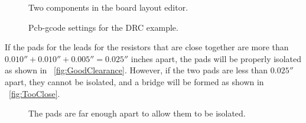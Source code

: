 \documentclass[11pt]{book}
\begin{document}
\begin{figure}
	\caption{Two components in the board layout editor.}
	\label{fig:TwoComponents}
\end{figure}

\begin{figure}
	\caption{Pcb-gcode settings for the DRC example.}
	\label{fig:DRCExampleSettings}
\end{figure}

If the pads for the leads for the resistors that are close together are more than $0.010'' + 0.010'' + 0.005'' = 0.025''$ inches apart, the pads will be properly isolated as shown in \figurename~\vref{fig:GoodClearance}. However, if the two pads are less than $0.025''$ apart, they cannot be isolated, and a bridge will be formed as shown in \figurename~\vref{fig:TooClose}.

\begin{figure}
	\caption{The pads are far enough apart to allow them to be isolated.}
	\label{fig:GoodClearance}
\end{figure}
\end{document}
